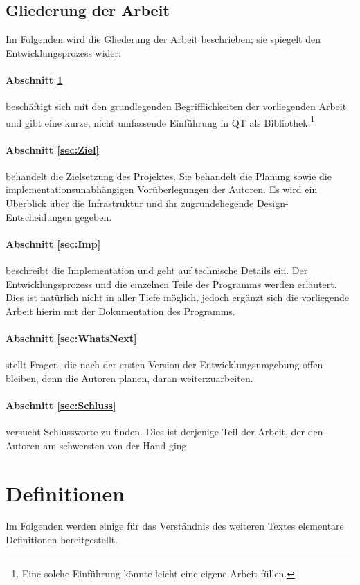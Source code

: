 \subsection{Gliederung der Arbeit}
	Im Folgenden wird die Gliederung der Arbeit beschrieben; sie spiegelt den Entwicklungsprozess wider:
\paragraph{Abschnitt \ref{sec:Def}}
	beschäftigt sich mit den grundlegenden Begrifflichkeiten der vorliegenden Arbeit und gibt eine kurze, nicht umfassende Einführung in QT als
	Bibliothek.\footnote{Eine solche Einführung könnte leicht eine eigene Arbeit füllen.}
\paragraph{Abschnitt \ref{sec:Ziel}}
	behandelt die Zielsetzung des Projektes. Sie behandelt die Planung sowie die implementationsunabhängigen Vorüberlegungen der Autoren.
	Es wird ein Überblick über die Infrastruktur und ihr zugrundeliegende Design-Entscheidungen gegeben.
\paragraph{Abschnitt \ref{sec:Imp}}
	beschreibt die Implementation und geht auf technische Details ein. Der Entwicklungsprozess und die einzelnen Teile des Programms werden 
	erläutert. Dies ist natürlich nicht in aller Tiefe möglich, jedoch ergänzt sich die vorliegende Arbeit hierin mit der Dokumentation des 
    Programms.
\paragraph{Abschnitt \ref{sec:WhatsNext}}
	stellt Fragen, die nach der ersten Version der Entwicklungsumgebung offen bleiben, denn die Autoren planen, daran weiterzuarbeiten.
\paragraph{Abschnitt \ref{sec:Schluss}}
	versucht Schlussworte zu finden. Dies ist derjenige Teil der Arbeit, der den Autoren am schwersten von der Hand ging.
\newpage
\section{Definitionen} \label{sec:Def}
	Im Folgenden werden einige für das Verständnis des weiteren Textes elementare Definitionen bereitgestellt.
